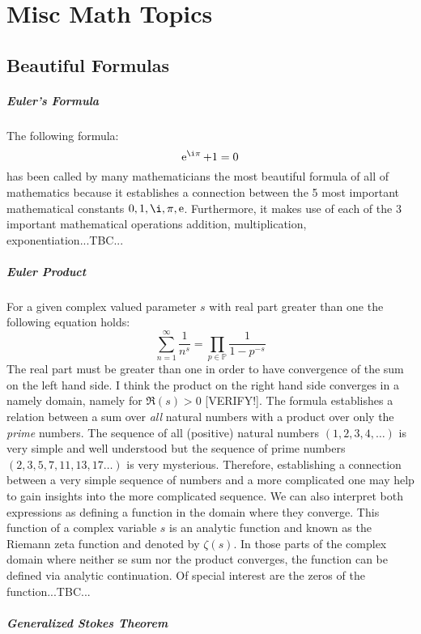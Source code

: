 \chapter{Misc Math Topics}

\section{Beautiful Formulas}

\paragraph{Euler's Formula}
The following formula:
\begin{equation}
\e^{\i \pi} + 1 = 0
\end{equation}
has been called by many mathematicians the most beautiful formula of all of mathematics because it establishes a connection between the 5 most important mathematical constants $0,1,\i,\pi,\e$. Furthermore, it makes use of each of the 3 important mathematical operations addition, multiplication, exponentiation...TBC...


\paragraph{Euler Product}
For a given complex valued parameter $s$ with real part greater than one the following equation holds:
\begin{equation}
\sum_{n=1}^{\infty} \frac{1}{n^s} = 
\prod_{p \in \mathbb{P}} \frac{1}{1 - p^{-s}}
\end{equation}
The real part must be greater than one in order to have convergence of the sum on the left hand side. I think the product on the right hand side converges in a namely domain, namely for $\Re(s) > 0$ [VERIFY!]. The formula establishes a relation between a sum over \emph{all} natural numbers with a product over only the \emph{prime} numbers. The sequence of all (positive) natural numbers $(1,2,3,4,\ldots)$ is very simple and well understood but the sequence of prime numbers $(2,3,5,7,11,13,17\ldots)$ is very mysterious. Therefore, establishing a connection between a very simple sequence of numbers and a more complicated one may help to gain insights into the more complicated sequence. We can also interpret both expressions as defining a function in the domain where they converge. This function of a complex variable $s$ is an analytic function and known as the Riemann zeta function and denoted by $\zeta(s)$. In those parts of the complex domain where neither se sum nor the product converges, the function can be defined via analytic continuation. Of special interest are the zeros of the function...TBC...

\paragraph{Generalized Stokes Theorem}

